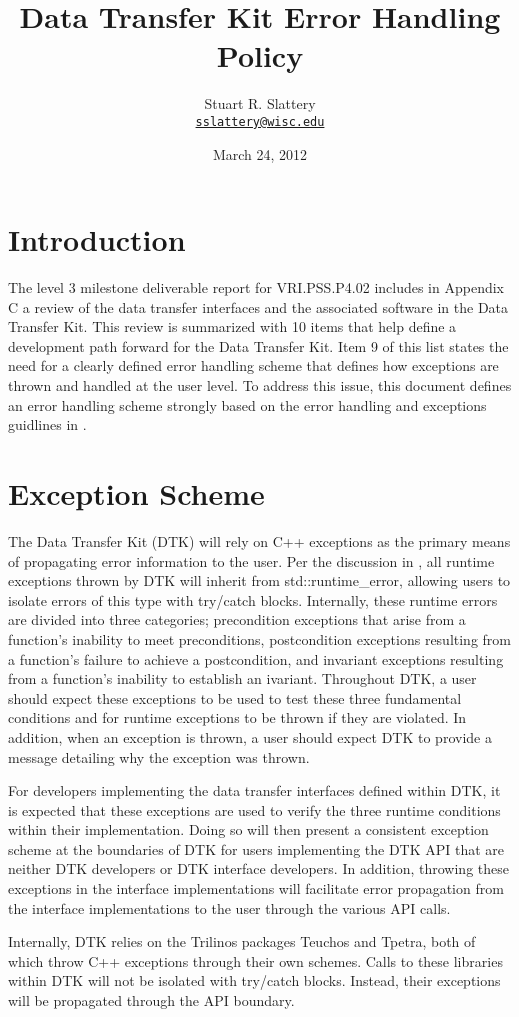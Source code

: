 \documentclass[letterpaper]{article}
\author{Stuart R. Slattery
\\ \href{mailto:sslattery@wisc.edu}{\texttt{sslattery@wisc.edu}}
}
\date{March 24, 2012}
\title{Data Transfer Kit Error Handling Policy}
\begin{document}
\maketitle
\section{Introduction}
The level 3 milestone deliverable report for VRI.PSS.P4.02 includes in
Appendix C a review of the data transfer interfaces and the associated
software in the Data Transfer Kit. This review is summarized with 10
items that help define a development path forward for the Data
Transfer Kit. Item 9 of this list states the need for a clearly
defined error handling scheme that defines how exceptions are thrown
and handled at the user level. To address this issue, this document
defines an error handling scheme strongly based on the error handling
and exceptions guidlines in \cite{Sutter_2004}.

\section{Exception Scheme}
The Data Transfer Kit (DTK) will rely on C++ exceptions as the
primary means of propagating error information to the user. Per the
discussion in \cite{Sutter_2004}, all runtime exceptions thrown by DTK
will inherit from std::runtime\_error, allowing users to isolate
errors of this type with try/catch blocks. Internally, these runtime
errors are divided into three categories; precondition exceptions that
arise from a function's inability to meet preconditions, postcondition
exceptions resulting from a function's failure to achieve a
postcondition, and invariant exceptions resulting from a function's
inability to establish an ivariant. Throughout DTK, a user should
expect these exceptions to be used to test these three fundamental
conditions and for runtime exceptions to be thrown if they are
violated. In addition, when an exception is thrown, a user should
expect DTK to provide a message detailing why the exception was
thrown.

For developers implementing the data transfer interfaces defined
within DTK, it is expected that these exceptions are used to verify
the three runtime conditions within their implementation. Doing so
will then present a consistent exception scheme at the boundaries of
DTK  for users implementing the DTK API that are neither DTK
developers or DTK interface developers. In addition, throwing these
exceptions in the interface implementations will facilitate error
propagation from the interface implementations to the user through the
various API calls. 

Internally, DTK relies on the Trilinos packages Teuchos and Tpetra,
both of which throw C++ exceptions through their own schemes. Calls to
these libraries within DTK will not be isolated with try/catch
blocks. Instead, their exceptions will be propagated through the API
boundary.

\pagebreak


\end{document}
